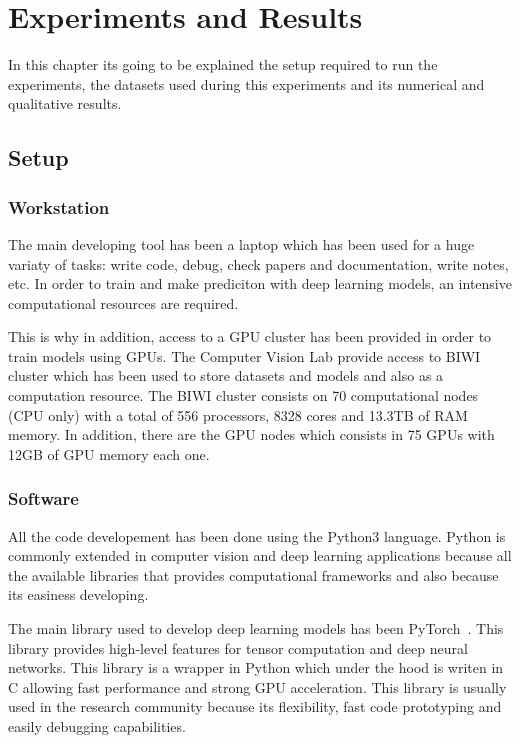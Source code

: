 
\chapter{Experiments and Results}
\label{cha:experimentsandresults}

In this chapter its going to be explained the setup required to run the experiments,
the datasets used during this experiments and its numerical and qualitative results.

\section{Setup}
\subsection{Workstation}

The main developing tool has been a laptop which has been used for a huge variaty of tasks: write code, debug, check papers and documentation, write notes, etc.
In order to train and make prediciton with deep learning models, an intensive computational resources are required.

This is why in addition, access to a GPU cluster has been provided in order to train models using GPUs.
The Computer Vision Lab provide access to BIWI cluster which has been used to store datasets and models and also as a computation resource. The BIWI cluster consists on 70 computational nodes (CPU only) with a total of 556 processors, 8328 cores and 13.3TB of RAM memory.
In addition, there are the GPU nodes which consists in 75 GPUs with 12GB of GPU memory each one.

\subsection{Software}

All the code developement has been done using the Python3 language.
Python is commonly extended in computer vision and deep learning applications because all the available libraries that provides computational frameworks and also because its easiness developing.

The main library used to develop deep learning models has been PyTorch~\cite{paszke2017automatic}. This library provides high-level features for tensor computation and deep neural networks.
This library is a wrapper in Python which under the hood is writen in C allowing fast performance and strong GPU acceleration.
This library is usually used in the research community because its flexibility, fast code prototyping and easily debugging capabilities.

